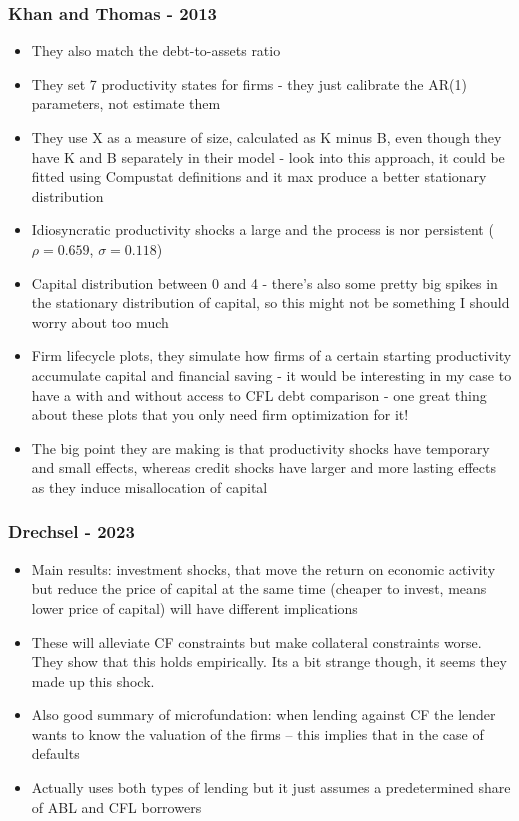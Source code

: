 \documentclass[12pt]{article}
\begin{document}
\subsubsection*{Khan and Thomas - 2013 \checkmark}
\begin{itemize}\setlength\itemsep{0em} \small
    \item They also match the debt-to-assets ratio
    \item They set 7 productivity states for firms - they just calibrate the AR(1) parameters, not estimate them
    \item They use X as a measure of size, calculated as K minus B, even though they have K and B separately in their model - look into this approach, it could be fitted using Compustat definitions and it max produce a better stationary distribution
    \item Idiosyncratic productivity shocks a large and the process is nor persistent ($\rho = 0.659$, $\sigma = 0.118$)
    \item Capital distribution between 0 and 4 - there's also some pretty big spikes in the stationary distribution of capital, so this might not be something I should worry about too much
    \item Firm lifecycle plots, they simulate how firms of a certain starting productivity accumulate capital and financial saving - it would be interesting in my case to have a with and without access to CFL debt comparison - one great thing about these plots that you only need firm optimization for it!
    \item The big point they are making is that productivity shocks have temporary and small effects, whereas credit shocks have larger and more lasting effects as they induce misallocation of capital
\end{itemize} \normalsize


\subsubsection*{Drechsel - 2023 \checkmark}
\begin{itemize}\setlength\itemsep{0em} \small
    \item Main results: investment shocks, that move the return on economic activity but reduce the price of capital at the same time (cheaper to invest, means lower price of capital) will have different implications
    \item These will alleviate CF constraints but make collateral constraints worse. They show that this holds empirically. Its a bit strange though, it seems they made up this shock. 
    \item Also good summary of microfundation: when lending against CF the lender wants to know the valuation of the firms – this implies that in the case of defaults 
    \item Actually uses both types of lending but it just assumes a predetermined share of ABL and CFL borrowers
\end{itemize} \normalsize
\end{document}
